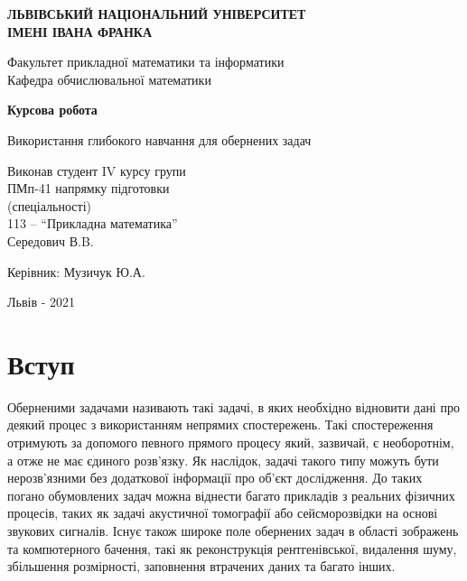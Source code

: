 \documentclass[14pt,a4paper]{extarticle}
\newcounter{e}
\newcounter{tabl}
\numberwithin{equation}{section}
\numberwithin{figure}{section}
\begin{document}
	\thispagestyle{empty}
	\begin{center}
		{\textbf{ЛЬВІВСЬКИЙ НАЦІОНАЛЬНИЙ УНІВЕРСИТЕТ \\ ІМЕНІ ІВАНА ФРАНКА}}\par
		{Факультет прикладної математики та інформатики \\ Кафедра обчислювальної математики}\par
		\vspace{40mm}
		{\textbf{\huge{Курсова робота}}}\par
		\vspace{5mm}
		{\large{Використання глибокого навчання для обернених задач}}\par
		\vspace{5mm}\par %
	\end{center}
	
	\vfill
	\vskip80pt
	
	\begin{flushleft}
		\hskip 8cm 
		Виконав студент IV курсу групи
		\\ \hskip8cm
		ПМп-41 напрямку підготовки 
		\\ \hskip8cm
		(спеціальності)
		\\ \hskip8cm
		113 -- ``Прикладна математика''
		\\ \hskip8cm
		Середович В.B.
	\end{flushleft}
	\begin{flushleft}
		\hskip8cm 
		Керівник: Музичук Ю.А.
	\end{flushleft}
	
	\vfill
	
	\begin{center}
		\large
		Львів - 2021
	\end{center}


	\newpage
	\thispagestyle{empty}
	\tableofcontents

	\newpage
	\thispagestyle{empty}
	\section*{Вступ}
	\begin{center}\end{center}
	
	Оберненими задачами називають такі задачі, в яких необхідно відновити дані про деякий процес з використанням непрямих спостережень. Такі спостереження отримують за допомого певного прямого процесу який, зазвичай, є необоротнім, а отже не має єдиного розв'язку. Як наслідок, задачі такого типу можуть бути нерозв'язними без додаткової інформації про об'єкт дослідження. До таких погано обумовлених задач можна віднести багато прикладів з реальних фізичних процесів, таких як задачі акустичної томографії або сейсморозвідки на основі звукових сигналів. Існує також широке поле обернених задач в області зображень та компютерного бачення, такі як реконструкція рентгенівської, видалення шуму, збільшення розмірності, заповнення втрачених даних та багато інших. 
	
\end{document}
